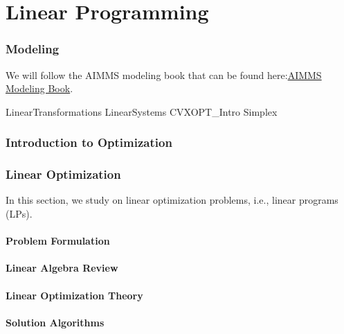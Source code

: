 %

\part{Linear Programming}
\section{Modeling}
We will follow the AIMMS modeling book that can be found here:\href{https://www.aimms.com/english/developers/resources/manuals/optimization-modeling}{AIMMS Modeling Book}.

{LinearTransformations}
{LinearSystems}
{CVXOPT_Intro}
{Simplex}



\newpage \section{Introduction to Optimization}


\newpage \section{Linear Optimization}
In this section, we study on linear optimization problems, i.e., linear programs (LPs).

\subsection{Problem Formulation} 


\subsection{Linear Algebra Review} 


\subsection{Linear Optimization Theory} 


\subsection{Solution Algorithms}  


